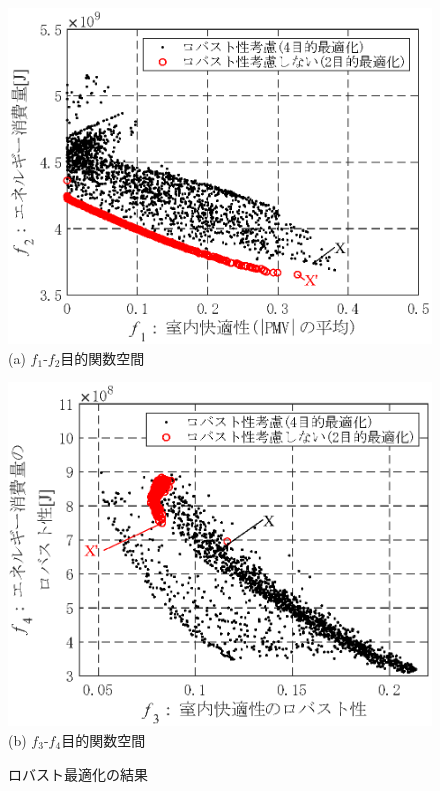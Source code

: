 \begin{figure}[htbp]
  \begin{center}
    \includegraphics[width=0.7\columnwidth,keepaspectratio=true]{fig/surrogate_result_pareto_robust_f1f2.eps}\\
    {(a) $f_1$-$f_2$目的関数空間}
  \end{center}
  \begin{center}
    \includegraphics[width=0.7\columnwidth,keepaspectratio=true]{fig/surrogate_result_pareto_robust_f3f4.eps}\\
    {(b) $f_3$-$f_4$目的関数空間}
  \end{center}
  \caption{ロバスト最適化の結果}
  \label{fig::surrogate_result_pareto_robust}
\end{figure}

